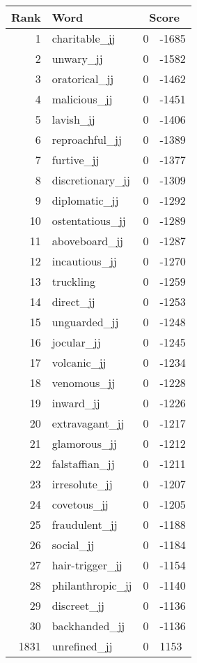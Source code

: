 \begin{longtable}[!htbp]{| rlr@{.}l |}
    \hline
    \textbf{Rank} & \textbf{Word} & \multicolumn{2}{c|}{\textbf{Score}} \\
    \hline
    \endhead
    1 & charitable\_jj & 0 & -1685 \\
    2 & unwary\_jj & 0 & -1582 \\
    3 & oratorical\_jj & 0 & -1462 \\
    4 & malicious\_jj & 0 & -1451 \\
    5 & lavish\_jj & 0 & -1406 \\
    6 & reproachful\_jj & 0 & -1389 \\
    7 & furtive\_jj & 0 & -1377 \\
    8 & discretionary\_jj & 0 & -1309 \\
    9 & diplomatic\_jj & 0 & -1292 \\
    10 & ostentatious\_jj & 0 & -1289 \\
    11 & aboveboard\_jj & 0 & -1287 \\
    12 & incautious\_jj & 0 & -1270 \\
    13 & truckling & 0 & -1259 \\
    14 & direct\_jj & 0 & -1253 \\
    15 & unguarded\_jj & 0 & -1248 \\
    16 & jocular\_jj & 0 & -1245 \\
    17 & volcanic\_jj & 0 & -1234 \\
    18 & venomous\_jj & 0 & -1228 \\
    19 & inward\_jj & 0 & -1226 \\
    20 & extravagant\_jj & 0 & -1217 \\
    21 & glamorous\_jj & 0 & -1212 \\
    22 & falstaffian\_jj & 0 & -1211 \\
    23 & irresolute\_jj & 0 & -1207 \\
    24 & covetous\_jj & 0 & -1205 \\
    25 & fraudulent\_jj & 0 & -1188 \\
    26 & social\_jj & 0 & -1184 \\
    27 & hair-trigger\_jj & 0 & -1154 \\
    28 & philanthropic\_jj & 0 & -1140 \\
    29 & discreet\_jj & 0 & -1136 \\
    30 & backhanded\_jj & 0 & -1136 \\
    1831 & unrefined\_jj & 0 & 1153 \\

\end{longtable}
